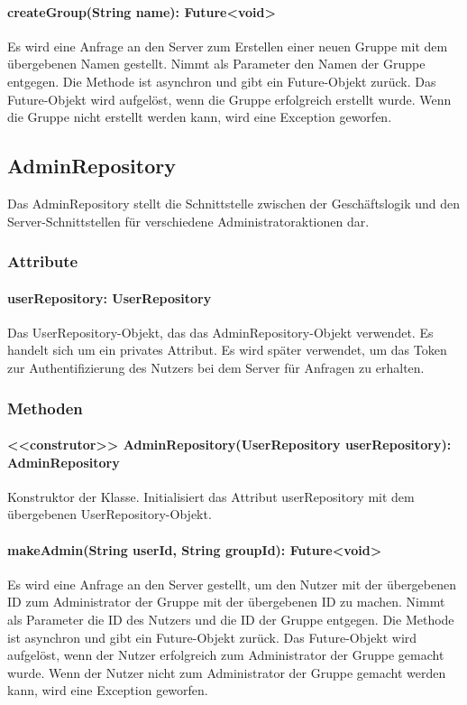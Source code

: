 \documentclass[parskip=full]{scrartcl}
\begin{document}
\paragraph{createGroup(String name): Future<void>}
Es wird eine Anfrage an den Server zum Erstellen einer neuen Gruppe mit dem übergebenen Namen gestellt. Nimmt als Parameter den Namen der Gruppe entgegen. Die Methode ist asynchron und gibt ein Future-Objekt zurück. Das Future-Objekt wird aufgelöst, wenn die Gruppe erfolgreich erstellt wurde. Wenn die Gruppe nicht erstellt werden kann, wird eine Exception geworfen.
\subsection{AdminRepository}
Das AdminRepository stellt die Schnittstelle zwischen der Geschäftslogik und den Server-Schnittstellen für verschiedene Administratoraktionen dar.
\subsubsection{Attribute}
\paragraph{userRepository: UserRepository}
Das UserRepository-Objekt, das das AdminRepository-Objekt verwendet. Es handelt sich um ein privates Attribut. Es wird später verwendet, um das Token zur Authentifizierung des Nutzers bei dem Server für Anfragen zu erhalten.
\subsubsection{Methoden}
\paragraph{<<construtor>> AdminRepository(UserRepository userRepository): AdminRepository}
Konstruktor der Klasse. Initialisiert das Attribut userRepository mit dem übergebenen UserRepository-Objekt.
\paragraph{makeAdmin(String userId, String groupId): Future<void>}
Es wird eine Anfrage an den Server gestellt, um den Nutzer mit der übergebenen ID zum Administrator der Gruppe mit der übergebenen ID zu machen. Nimmt als Parameter die ID des Nutzers und die ID der Gruppe entgegen. Die Methode ist asynchron und gibt ein Future-Objekt zurück. Das Future-Objekt wird aufgelöst, wenn der Nutzer erfolgreich zum Administrator der Gruppe gemacht wurde. Wenn der Nutzer nicht zum Administrator der Gruppe gemacht werden kann, wird eine Exception geworfen.
\end{document}
